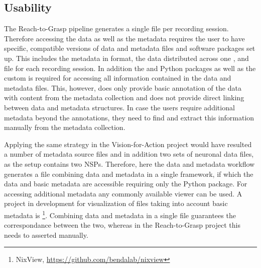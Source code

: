\subsection{Usability}
The Reach-to-Grasp pipeline generates a single  file per recording session. Therefore accessing the data as well as the metadata requires the user to have  specific, compatible versions of data and metadata files and software packages set up. This includes the metadata in  format, the data distributed across one ,  and  file for each recording session. In addition the  and  Python packages as well as the custom  is required for accessing all information contained in the data and metadata files. This, however, does only provide basic annotation of the data with content from the metadata collection and does not provide direct linking between data and metadata structures. In case the users require additional metadata beyond the annotations, they need to find and extract this information manually from the metadata collection.

Applying the same strategy in the Vision-for-Action project would have resulted a number of metadata source files and in addition two sets of neuronal data files, as the setup contains two NSPs. Therefore, here the data and metadata workflow generates a  file combining data and metadata in a single framework, if which the data and basic metadata are accessible requiring only the Python  package. For accessing additional metadata any commonly available  viewer can be used. A project in development for visualization of  files taking into account basic metadata is \footnote{NixView, \url{https://github.com/bendalab/nixview}}. Combining data and metadata in a single file guarantees the correspondance between the two, whereas in the Reach-to-Grasp project this needs to asserted manually.

